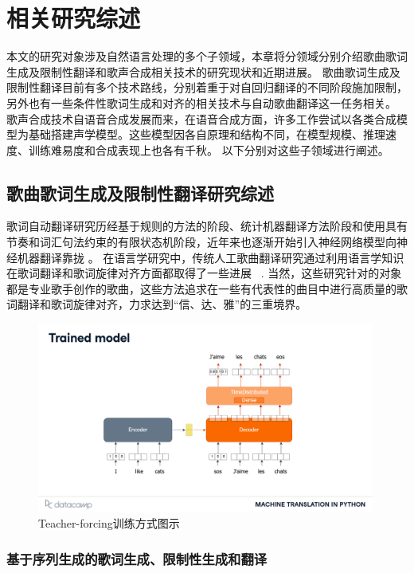\chapter{相关研究综述}
本文的研究对象涉及自然语言处理的多个子领域，本章将分领域分别介绍歌曲歌词生成及限制性翻译和歌声合成相关技术的研究现状和近期进展。
歌曲歌词生成及限制性翻译目前有多个技术路线，分别着重于对自回归翻译的不同阶段施加限制，另外也有一些条件性歌词生成和对齐的相关技术与自动歌曲翻译这一任务相关。
歌声合成技术自语音合成发展而来，在语音合成方面，许多工作尝试以各类合成模型为基础搭建声学模型。这些模型因各自原理和结构不同，在模型规模、推理速度、训练难易度和合成表现上也各有千秋。
以下分别对这些子领域进行阐述。
\section{歌曲歌词生成及限制性翻译研究综述}
歌词自动翻译研究历经基于规则的方法的阶段、统计机器翻译方法阶段和使用具有节奏和词汇句法约束的有限状态机阶段\citep{spanish_verse, Manurung2004AnEA, He_Zhou_Jiang_2012}，近年来也逐渐开始引入神经网络模型向神经机器翻译靠拢
\citep{ghazvininejad-etal-2016-generating,ghazvininejad-etal-2017-hafez, ghazvininejad-etal-2018-neural}。
在语言学研究中，传统人工歌曲翻译研究通过利用语言学知识在歌词翻译和歌词旋律对齐方面都取得了一些进展
~\citep{interplay_lyrics_melody,low_2003,low2008translating,low_2022,three_d_of_singability,trans_of_music}.
当然，这些研究针对的对象都是专业歌手创作的歌曲，这些方法追求在一些有代表性的曲目中进行高质量的歌词翻译和歌词旋律对齐，力求达到``信、达、雅''的三重境界。
\begin{figure}[ht]
  \centering
  \includegraphics[width=0.99\textwidth]{figure/related/teacher-forcing.pdf}
  \caption{Teacher-forcing训练方式图示}
  \label{fig:tf_train}
\end{figure}
\subsection{基于序列生成的歌词生成、限制性生成和翻译}
